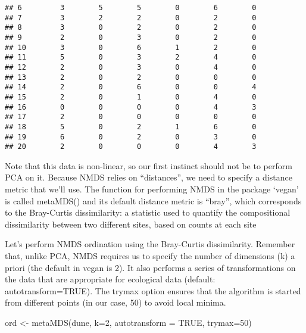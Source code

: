 \documentclass[
]{book}
\newenvironment{Shaded}{\begin{snugshade}}{\end{snugshade}}
\newcommand{\AttributeTok}[1]{\textcolor[rgb]{0.77,0.63,0.00}{#1}}
\newcommand{\ConstantTok}[1]{\textcolor[rgb]{0.00,0.00,0.00}{#1}}
\newcommand{\DecValTok}[1]{\textcolor[rgb]{0.00,0.00,0.81}{#1}}
\newcommand{\FunctionTok}[1]{\textcolor[rgb]{0.00,0.00,0.00}{#1}}
\newcommand{\NormalTok}[1]{#1}
\newcommand{\OtherTok}[1]{\textcolor[rgb]{0.56,0.35,0.01}{#1}}
\begin{document}
\begin{verbatim}
## 6         3        5        5        0        6        0
## 7         3        2        2        0        2        0
## 8         3        0        2        0        2        0
## 9         2        0        3        0        2        0
## 10        3        0        6        1        2        0
## 11        5        0        3        2        4        0
## 12        2        0        3        0        4        0
## 13        2        0        2        0        0        0
## 14        2        0        6        0        0        4
## 15        2        0        1        0        4        0
## 16        0        0        0        0        4        3
## 17        2        0        0        0        0        0
## 18        5        0        2        1        6        0
## 19        6        0        2        0        3        0
## 20        2        0        0        0        4        3
\end{verbatim}

Note that this data is non-linear, so our first instinct should not be to perform PCA on it. Because NMDS relies on ``distances'', we need to specify a distance metric that we'll use. The function for performing NMDS in the package `vegan' is called metaMDS() and its default distance metric is ``bray'', which corresponds to the Bray-Curtis dissimilarity: a statistic used to quantify the compositional dissimilarity between two different sites, based on counts at each site

Let's perform NMDS ordination using the Bray-Curtis dissimilarity. Remember that, unlike PCA, NMDS requires us to specify the number of dimensions (k) a priori (the default in vegan is 2). It also performs a series of transformations on the data that are appropriate for ecological data (default: autotransform=TRUE). The trymax option ensures that the algorithm is started from different points (in our case, 50) to avoid local minima.

\begin{Shaded}
\begin{Highlighting}[]
\NormalTok{ord }\OtherTok{\textless{}{-}} \FunctionTok{metaMDS}\NormalTok{(dune, }\AttributeTok{k=}\DecValTok{2}\NormalTok{, }\AttributeTok{autotransform =} \ConstantTok{TRUE}\NormalTok{, }\AttributeTok{trymax=}\DecValTok{50}\NormalTok{)}
\end{Highlighting}
\end{Shaded}
\end{document}
